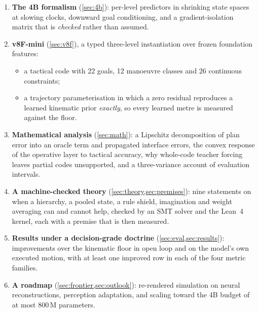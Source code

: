 \documentclass[10pt,twocolumn]{article}
\makeatletter
\theoremstyle{remark}
\renewcommand\paragraph{\@startsection{paragraph}{4}{\z@}{1.6ex \@plus .5ex \@minus .2ex}{-1em}{\normalfont\normalsize\bfseries}}
\makeatother
\begin{document}
\paragraph{Contributions.}
\begin{enumerate}[label=(\roman*)]
  \item \textbf{The 4B formalism} (\cref{sec:4b}): per-level predictors in shrinking state spaces at slowing clocks, downward goal
        conditioning, and a gradient-isolation matrix that is \emph{checked} rather than assumed.
  \item \textbf{v8F-mini} (\cref{sec:v8f}), a typed three-level instantiation over frozen foundation features:
        \begin{itemize}
          \item a tactical code with 22 goals, 12 manoeuvre classes and 26 continuous constraints;
          \item a trajectory parameterisation in which a zero residual reproduces a learned kinematic prior \emph{exactly}, so every
                learned metre is measured against the floor.
        \end{itemize}
  \item \textbf{Mathematical analysis} (\cref{sec:math}): a Lipschitz decomposition of plan error into an oracle term and propagated
        interface errors, the convex response of the operative layer to tactical accuracy, why whole-code teacher forcing leaves
        partial codes unsupported, and a three-variance account of evaluation intervals.
  \item \textbf{A machine-checked theory} (\cref{sec:theory,sec:premises}): nine statements on when a hierarchy, a pooled state, a
        rule shield, imagination and weight averaging can and cannot help, checked by an SMT solver and the Lean~4 kernel, each
        with a premise that is then measured.
  \item \textbf{Results under a decision-grade doctrine} (\cref{sec:eval,sec:results}): improvements over the kinematic floor in open
        loop and on the model's own executed motion, with at least one improved row in each of the four metric families.
  \item \textbf{A roadmap} (\cref{sec:frontier,sec:outlook}): re-rendered simulation on neural reconstructions, perception adaptation,
        and scaling toward the 4B budget of at most 800\,M parameters.
\end{enumerate}

\end{document}
